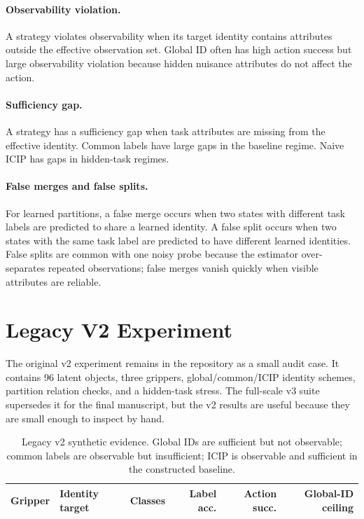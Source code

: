 \documentclass{article}
\newcommand{\icip}{\textsc{ICIP}}
\begin{document}
\paragraph{Observability violation.}
A strategy violates observability when its target identity contains attributes outside the effective observation set.
Global ID often has high action success but large observability violation because hidden nuisance attributes do not affect the action.

\paragraph{Sufficiency gap.}
A strategy has a sufficiency gap when task attributes are missing from the effective identity.
Common labels have large gaps in the baseline regime.
Naive \icip{} has gaps in hidden-task regimes.

\paragraph{False merges and false splits.}
For learned partitions, a false merge occurs when two states with different task labels are predicted to share a learned identity.
A false split occurs when two states with the same task label are predicted to have different learned identities.
False splits are common with one noisy probe because the estimator over-separates repeated observations; false merges vanish quickly when visible attributes are reliable.

\section{Legacy V2 Experiment}

The original v2 experiment remains in the repository as a small audit case.
It contains 96 latent objects, three grippers, global/common/\icip{} identity schemes, partition relation checks, and a hidden-task stress.
The full-scale v3 suite supersedes it for the final manuscript, but the v2 results are useful because they are small enough to inspect by hand.

\begin{table}[h]
\centering
\caption{Legacy v2 synthetic evidence. Global IDs are sufficient but not observable; common labels are observable but insufficient; \icip{} is observable and sufficient in the constructed baseline.}
\label{tab:legacy-metrics}
\begin{tabular}{llrrrr}
\toprule
Gripper & Identity target & Classes & Label acc. & Action succ. & Global-ID ceiling \\
\midrule

\end{tabular}
\end{table}
\end{document}
